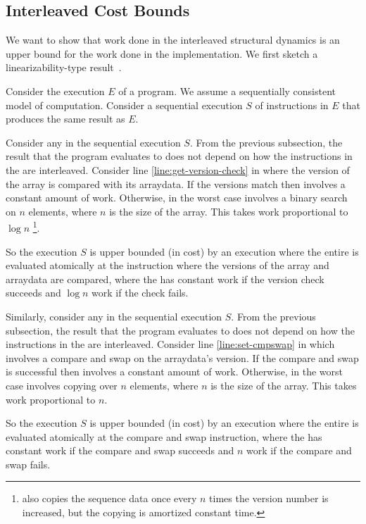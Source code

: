 \subsection{Interleaved Cost Bounds}

We want to show that work done in the interleaved structural dynamics is an upper bound for the work done in the implementation. We first sketch a linearizability-type result~\cite{linearizability}.

Consider the execution $E$ of a program. We assume a sequentially consistent model of computation. Consider a sequential execution $S$ of instructions in $E$ that produces the same result as $E$. 

Consider any \get{} in the sequential execution $S$. From the previous subsection, the result that the program evaluates to does not depend on how the instructions in the \get{} are interleaved. Consider line \ref{line:get-version-check} in \get{} where the version of the array is compared with its arraydata. If the versions match then \get{} involves a constant amount of work. Otherwise, in the worst case \get{} involves a binary search on $n$ elements, where $n$ is the size of the array. This takes work proportional to $\log{n}$ \footnote{\set{} also copies the sequence data once every $n$ times the version number is increased, but the copying is amortized constant time.}.

So the execution $S$ is upper bounded (in cost) by an execution where the entire \get{} is evaluated atomically at the instruction where the versions of the array and arraydata are compared, where the \get{} has constant work if the version check succeeds and $\log{n}$ work if the check fails.

Similarly, consider any \set{} in the sequential execution $S$. From the previous subsection, the result that the program evaluates to does not depend on how the instructions in the \set{} are interleaved. Consider line \ref{line:set-cmpswap} in \set{} which involves a compare and swap on the arraydata's version. If the compare and swap is successful then \set{} involves a constant amount of work. Otherwise, in the worst case \set{} involves copying over $n$ elements, where $n$ is the size of the array. This takes work proportional to $n$.

So the execution $S$ is upper bounded (in cost) by an execution where the entire \set{} is evaluated atomically at the compare and swap instruction, where the \set{} has constant work if the compare and swap succeeds and $n$ work if the compare and swap fails.

